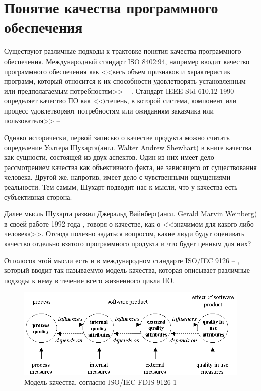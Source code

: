 \section{Понятие качества программного обеспечения}

Существуют различные подходы к трактовке понятия качества программного обеспечения. Международный стандарт ISO 8402:94, например вводит качество программного обеспечения как <<весь объем признаков и характеристик программ, который относится к их способности удовлетворять установленным или предполагаемым потребностям>>  -- \cite{ISO840294}. Стандарт IEEE Std 610.12-1990 определяет качество ПО как <<степень, в которой система, компонент или процесс удовлетворяют потребностям или ожиданиям заказчика или пользователя>> -- \cite{1990ieee}

Однако исторически, первой записью о качестве продукта можно считать определение Уолтера Шухарта(англ. Walter Andrew Shewhart) в книге \cite{shewhart1931economic} качества как сущности, состоящей из двух аспектов. Один из них имеет дело рассмотрением качества как объективного факта, не зависящего от существования человека. Другой же, напротив, имеет дело с чувственными ощущениями реальности. Тем самым, Шухарт подводит нас к мысли, что у качества есть субъективная сторона.

Далее мысль Шухарта развил Джеральд Вайнберг(англ. Gerald Marvin Weinberg) в своей работе 1992 года \cite{weinberg1993quality}, говоря о качестве, как о <<значимом для какого-либо человека>>. Отсюда полезно задаться вопросом, какие люди будут оценивать качество отдельно взятого программного продукта и что будет ценным для них?

Отголосок этой мысли есть и в международном стандарте ISO/IEC 9126 -- \cite{ISOIEC9126}, который вводит так называемую модель качества, которая описывает различные подходы к нему в течение всего жизненного цикла ПО.

\begin{figure}[H]
  \centering
  \includegraphics[width=\textwidth]{img/quality_framework.png}
  \caption{Модель качества, согласно ISO/IEC FDIS 9126-1}
\end{figure}

